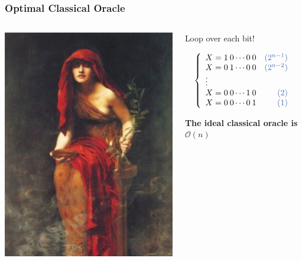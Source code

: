 \documentclass[aspectratio=169,11pt,hyperref={colorlinks=true}]{beamer}
\begin{document}
\begin{frame}
    \frametitle{Optimal Classical Oracle}
	\begin{columns}
        \begin{column}{.3\textwidth}
            \centering
            \includegraphics[width=\textwidth]{the_oracle.jpg}
        \end{column}
        \begin{column}{.7\textwidth}
            \centering
            Loop over each bit!
            \begin{flushleft}
            \[\left \{
                \begin{array}{lr}
                    X = 1\>0 \dotsb 0\>0 & \color{ibm} (2^{n-1})\\
                    X = 0\>1 \dotsb 0\>0 & \color{ibm} (2^{n-2})\\
                   \vdots  \\
                    X = 0\>0 \dotsb 1\>0 & \color{ibm} (2)\\
                    X = 0\>0 \dotsb 0\>1  & \color{ibm} (1)
                 \end{array}
               \right.
           \]
            \end{flushleft}
            \begin{center}
            \large \textbf{The ideal classical oracle is $\mathcal{O}(n)$}
%            
            \end{center}
        \end{column}
    \end{columns}
\end{frame}
\end{document}
